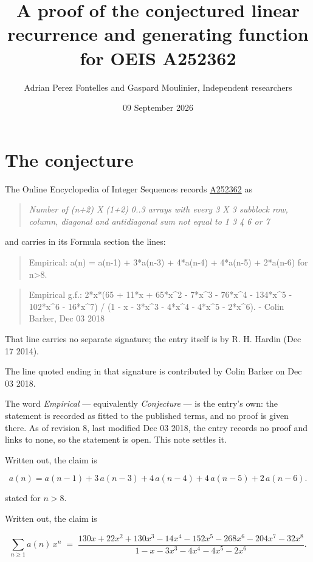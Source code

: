 \documentclass[11pt]{article}
\title{A proof of the conjectured linear recurrence and generating function for OEIS A252362}
\author{Adrian Perez Fontelles and Gaspard Moulinier, Independent researchers}
\date{09 September 2026}
\theoremstyle{definition}
\begin{document}
\maketitle
\section{The conjecture}

The Online Encyclopedia of Integer Sequences records \href{https://oeis.org/A252362}{A252362} as

\begin{quote}\itshape Number of (n+2) X (1+2) 0..3 arrays with every 3 X 3 subblock row, column, diagonal and antidiagonal sum not equal to 1 3 4 6 or 7\end{quote}

and carries in its Formula section the lines:

\begin{quote}\ttfamily Empirical: a(n) = a(n-1) + 3*a(n-3) + 4*a(n-4) + 4*a(n-5) + 2*a(n-6) for n>8.\end{quote}

\begin{quote}\ttfamily Empirical g.f.: 2*x*(65 + 11*x + 65*x\textasciicircum{}2 - 7*x\textasciicircum{}3 - 76*x\textasciicircum{}4 - 134*x\textasciicircum{}5 - 102*x\textasciicircum{}6 - 16*x\textasciicircum{}7) / (1 - x - 3*x\textasciicircum{}3 - 4*x\textasciicircum{}4 - 4*x\textasciicircum{}5 - 2*x\textasciicircum{}6). - Colin Barker, Dec 03 2018\end{quote}

That line carries no separate signature; the entry itself is by R. H. Hardin (Dec 17 2014).

The line quoted ending in that signature is contributed by Colin Barker on Dec 03 2018.

The word {\itshape Empirical} --- equivalently {\itshape Conjecture} --- is the entry's own: the statement is recorded as fitted to the published terms, and no proof is given there. As of revision 8, last modified Dec 03 2018, the entry records no proof and links to none, so the statement is open. This note settles it.

Written out, the claim is

\[a(n) = a(n-1) + 3\,a(n-3) + 4\,a(n-4) + 4\,a(n-5) + 2\,a(n-6).\]

stated for $n > 8$.

Written out, the claim is

\[\sum_{n \ge 1} a(n)\,x^n \;=\; \frac{130x + 22x^{2} + 130x^{3} - 14x^{4} - 152x^{5} - 268x^{6} - 204x^{7} - 32x^{8}}{1 - x - 3x^{3} - 4x^{4} - 4x^{5} - 2x^{6}}.\]
\end{document}
